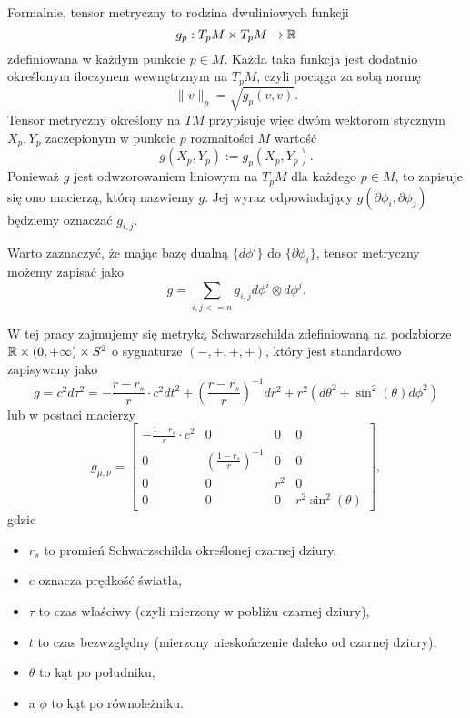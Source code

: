 Formalnie, tensor metryczny to rodzina dwuliniowych funkcji
$$ g_p:T_p M \times T_p M \to \mathbb{R} $$
zdefiniowana w każdym punkcie $p \in M$. Każda taka funkcja jest dodatnio określonym iloczynem wewnętrznym na $T_p M$, czyli pociąga za sobą normę 
$$ \|v\|_p=\sqrt{g_p (v, v)}. $$
Tensor metryczny określony na $T M$ przypisuje więc dwóm wektorom stycznym $X_p, Y_p$ zaczepionym w punkcie $p$ rozmaitości $M$ wartość
$$ g(X_p, Y_p):= g_p (X_p, Y_p). $$
Ponieważ $g$ jest odwzorowaniem liniowym na $T_p M$ dla każdego $p \in M$, to zapisuje się ono macierzą, którą nazwiemy $g$. Jej wyraz odpowiadający $g(\partial \phi_i, \partial \phi_j)$ będziemy oznaczać $g_{i,j}$.

Warto zaznaczyć, że mając bazę dualną $\{d \phi^i\}$ do $\{ \partial \phi_i\}$, tensor metryczny możemy zapisać jako
$$ g=\sum_{i, j <= n} g_{i, j} d \phi^i \otimes d \phi^j. $$

W tej pracy zajmujemy się metryką Schwarzschilda zdefiniowaną na podzbiorze $\mathbb{R} \times (0, +\infty) \times S^2$ o sygnaturze $(-, +, +, +)$, który jest standardowo zapisywany jako
$$ g = c^2 d \tau^2 = -\frac{r - r_s}{r}\cdot c^2d t^2 + \left( \frac{r - r_s}{r}\right)^{-1} d r^2 + r^2(d \theta^2 + \sin^2(\theta) d \phi^2) $$
lub w postaci macierzy \cite{notatkiUoCSD}
$$
g_{\mu, \nu} = \begin{bmatrix}
  -\frac{1 - r_s}{r}\cdot c^2 & 0                               & 0   & 0 \\
  0                 & \left(\frac{1 - r_s}{r}\right)^{-1} & 0   & 0 \\
  0                 & 0                                   & r^2 & 0 \\ 
  0                 & 0                                   & 0   & r^2 \sin^2(\theta)
\end{bmatrix}, 
$$
gdzie 
\begin{itemize}
  \item $r_s$ to promień Schwarzschilda określonej czarnej dziury, 
  \item $c$ oznacza prędkość światła, 
  \item $\tau$ to czas właściwy (czyli mierzony w pobliżu czarnej dziury), 
  \item $t$ to czas bezwzględny (mierzony nieskończenie daleko od czarnej dziury), 
  \item $\theta$ to kąt po południku, 
  \item a $\phi$ to kąt po równoleżniku.
\end{itemize}

